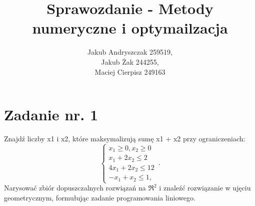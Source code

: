 \documentclass{article}
\begin{document}
\title{Sprawozdanie - Metody numeryczne i optymailzacja}
\author{Jakub Andryszczak 259519,\\ Jakub Żak 244255,\\ Maciej Cierpisz 249163}
\date{}
\maketitle

\newpage
\tableofcontents

\newpage
\section{Zadanie nr. 1}
Znajdź liczby x1 i x2, które maksymalizują sumę x1 + x2 przy ograniczeniach:
\begin{equation}
    \begin{cases}
      x_{1} \geq 0,x_{2}\geq 0 \\
     x_{1}+2x_{2} \leq 2 \\
     4x_{1} + 2x_{2}\leq 12\\
     -x_1 + x_2 \leq 1, 
    \end{cases}\,.
  \end{equation}
  Narysować zbiór dopuszczalnych rozwiązań na $\Re^2$ i znaleźć rozwiązanie w ujęciu
geometrycznym, formułując zadanie programowania liniowego.
\newline
\end{document}
